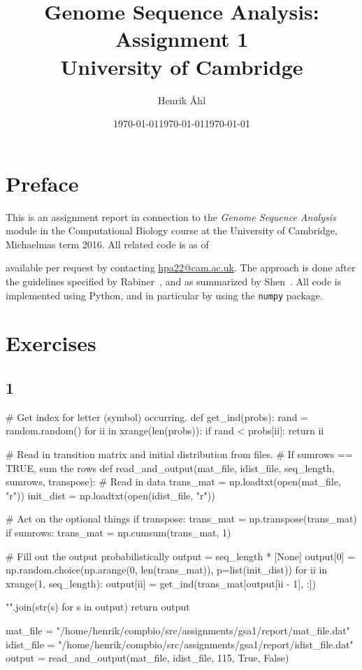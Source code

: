 \documentclass[10pt]{article}\usepackage[]{graphicx}\usepackage[]{color}
\title
{
\textbf
{
Genome Sequence Analysis: Assignment 1}\\[1em]
\small{University of Cambridge}
}
\author{Henrik Åhl}
\date{\today}
\theoremstyle{plain}
\begin{document}
\date{\today}
\maketitle
\setcounter{page}{1}
\section*{Preface}
This is an assignment report in connection to the \textit{Genome Sequence Analysis} module in the Computational Biology course at the University of Cambridge, Michaelmas term 2016. All related code is as of \date{\today} available per request by contacting \href{mailto:hpa22@cam.ac.uk}{hpa22@cam.ac.uk}. The approach is done after the guidelines specified by Rabiner~\cite{rabiner}, and as summarized by Shen~\cite{shen}. All code is implemented using Python, and in particular by using the \texttt{numpy} package. 

\section*{Exercises}
\subsection*{1}
\begin{Schunk}
\begin{Sinput}
# Get index for letter (symbol) occurring.
def get_ind(probs):
    rand = random.random()
    for ii in xrange(len(probs)):
        if rand < probs[ii]:
            return ii


# Read in transition matrix and initial distribution from files.
# If sumrows == TRUE, sum the rows
def read_and_output(mat_file, idist_file, seq_length, sumrows, transpose):
    # Read in data
    trans_mat = np.loadtxt(open(mat_file, "r"))
    init_dist = np.loadtxt(open(idist_file, "r"))

    # Act on the optional things
    if transpose:
        trans_mat = np.transpose(trans_mat)
    if sumrows:
        trans_mat = np.cumsum(trans_mat, 1)

    # Fill out the output probabilistically
    output = seq_length * [None]
    output[0] = np.random.choice(np.arange(0, len(trans_mat)), p=list(init_dist))
    for ii in xrange(1, seq_length):
        output[ii] = get_ind(trans_mat[output[ii - 1], :])

    "".join(str(s) for s in output)
    return output


mat_file = "/home/henrik/compbio/src/assignments/gsa1/report/mat_file.dat"
idist_file = "/home/henrik/compbio/src/assignments/gsa1/report/idist_file.dat"
output = read_and_output(mat_file, idist_file, 115, True, False)
\end{Sinput}
\end{Schunk}
 
\end{document}
